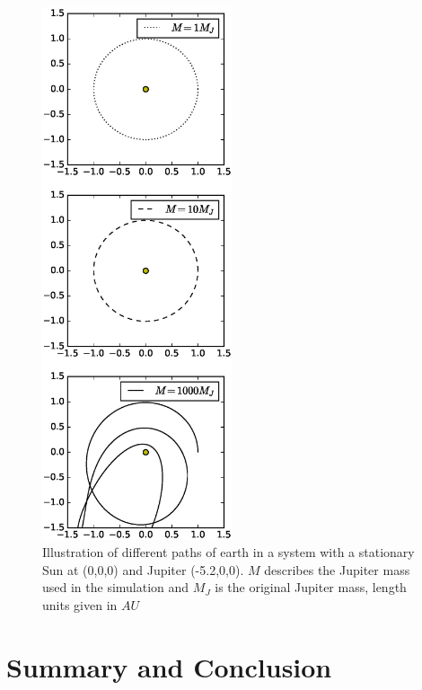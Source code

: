 \documentclass[twoside,twocolumn]{article}
\begin{document}
\begin{figure}[p]
\includegraphics[trim={0 2.5cm 0 2.5cm},width=0.5\textwidth, clip]{figures/earthJup.eps} 
		\caption{Illustration of different paths of earth in a system with a stationary Sun at (0,0,0) and Jupiter (-5.2,0,0). $M$ describes the Jupiter mass used in the simulation and $M_J$ is the original Jupiter mass, length units given in $AU$}\label{fig:earth_vel}
\end{figure}
\section{Summary and Conclusion}
\label{sec:conclusion}
	
	
	
\end{document}

